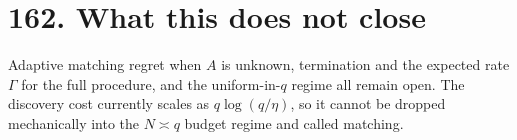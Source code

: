 \documentclass[9pt,twocolumn]{article}
\renewcommand{\_}{\CIGunderscore\allowbreak}
\begin{document}
\section*{162. What this does not close}
Adaptive matching regret when $A$ is unknown, termination and the expected rate $\Gamma$ for the full procedure, and the uniform-in-$q$ regime all remain open. The discovery cost currently scales as $q\log(q/\eta)$, so it cannot be dropped mechanically into the $N\asymp q$ budget regime and called matching.
\end{document}
